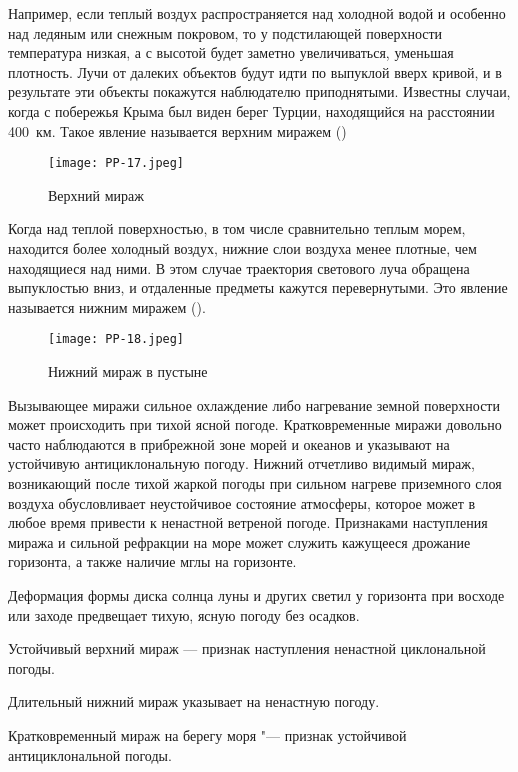 Например, если теплый воздух распространяется над холодной водой и
особенно над ледяным или снежным покровом, то у подстилающей
поверхности температура низкая, а с высотой будет заметно
увеличиваться, уменьшая плотность. Лучи от далеких объектов будут идти
по выпуклой вверх кривой, и в результате эти объекты покажутся
наблюдателю приподнятыми. Известны случаи, когда с побережья Крыма был
виден берег Турции, находящийся на расстоянии 400~км. Такое явление
называется верхним миражем ()

\begin{figure}[htb]
  \centering{}
  \texttt{[image: PP-17.jpeg]}
  \caption{Верхний мираж}
  \label{fig:pp17}
  \small
  \centering{}
\end{figure}

Когда над теплой поверхностью, в том числе сравнительно теплым морем,
находится более холодный воздух, нижние слои воздуха менее плотные,
чем находящиеся над ними. В этом случае траектория светового луча
обращена выпуклостью вниз, и отдаленные предметы кажутся
перевернутыми. Это явление называется нижним миражем ().

\begin{figure}[htb]
  \centering{}
  \texttt{[image: PP-18.jpeg]}
  \caption{Нижний мираж в пустыне}
  \label{fig:pp18}
  \small
  \centering{}
\end{figure}

Вызывающее миражи сильное охлаждение либо нагревание земной
поверхности может происходить при тихой ясной погоде. Кратковременные
миражи довольно часто наблюдаются в прибрежной зоне морей и океанов и
указывают на устойчивую антициклональную погоду. Нижний отчетливо
видимый мираж, возникающий после тихой жаркой погоды при сильном
нагреве приземного слоя воздуха обусловливает неустойчивое состояние
атмосферы, которое может в любое время привести к ненастной ветреной
погоде. Признаками наступления миража и сильной рефракции на море
может служить кажущееся дрожание горизонта, а также наличие мглы на
горизонте.

 Деформация формы диска солнца луны и других светил у горизонта
при восходе или заходе предвещает тихую, ясную погоду без осадков.

 Устойчивый верхний мираж — признак наступления ненастной
циклональной погоды.

 Длительный нижний мираж указывает на ненастную погоду.

 Кратковременный мираж на берегу моря "--- признак устойчивой
антициклональной погоды.

